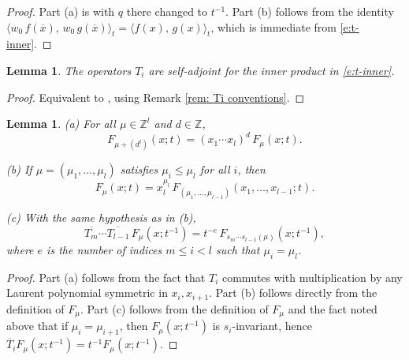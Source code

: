 \documentclass[12pt]{amsart}
\newtheorem{lemma}[thm]{Lemma}
\theoremstyle{definition}
\theoremstyle{remark}
\newcommand{\ZZ}{{\mathbb Z}}
\begin{document}
\begin{proof}
Part (a) is \cite[Prop.~4.3.2]{BHMPS23} with $q$ there changed to
$t^{-1}$.  Part (b) follows from the identity $\langle w_{0}\,
f(\overline{x}),\, w_{0}\, g(\overline{x}) \rangle _{t} = \langle
f(x),\, g(x) \rangle_{t}$, which is immediate from \eqref{e:t-inner}.
\end{proof}

\begin{lemma}\label{lem:Ti-self-adjoint}
The operators $T_{i}$ are self-adjoint for the inner product in
\eqref{e:t-inner}.
\end{lemma}

\begin{proof}
Equivalent to \cite[Lemma~4.3.3]{BHMPS23}, using Remark \ref{rem: Ti
conventions}.
\end{proof}

\begin{lemma}\label{lem:F-basics}
(a) For all $\mu \in \ZZ ^{l}$ and $d\in \ZZ $,
\begin{equation}\label{e:F-shift}
F_{\mu +(d^{l})}(x; t) = (x_{1}\cdots x_{l})^{d}\, F_{\mu
}(x;t).
\end{equation}

(b) If $\mu =(\mu_1,\ldots,\mu_l)$ satisfies $\mu _{i}\leq
\mu _{l}$ for all $i$, then
\begin{equation}\label{e:F-factors}
F_{\mu }(x;t) = x_{l}^{\mu _{l}}\, F_{(\mu
_{1},\ldots,\mu _{l-1})}(x_{1},\ldots,x_{l-1};t).
\end{equation}

(c) With the same hypothesis as in (b),
\begin{equation}\label{e:Tis-on-F}
\overline{T_{m}}\cdots \overline{T_{l-1}}\, F_{\mu }(x;t^{-1}) =
t^{-e}\, F_{s_{m}\cdots s_{l-1}(\mu )}(x; t^{-1}),
\end{equation}
where $e$ is the number of indices $m\leq i< l$ such that $\mu_{i}
= \mu _{l}$.
\end{lemma}

\begin{proof}
Part (a) follows from the fact that $T_i$ commutes with multiplication
by any Laurent polynomial symmetric in $x_i, x_{i+1}$.  Part (b)
follows directly from the definition of $F_\mu$.  Part (c) follows
from the definition of $F_\mu$ and the fact noted above that if $\mu_i
= \mu_{i+1}$, then $F_{\mu }(x;t^{-1})$ is $s_{i}$-invariant, hence
$\overline{T}_i F_\mu(x;t^{-1}) = t^{-1} F_\mu(x;t^{-1})$.
\end{proof}
\end{document}
